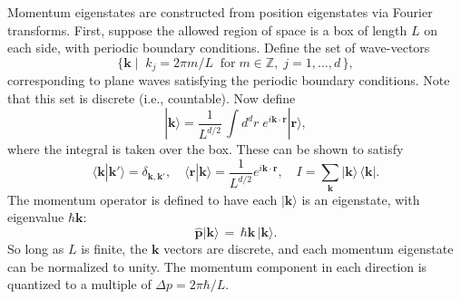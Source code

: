 \documentclass[pra,12pt]{revtex4}
\begin{document}
Momentum eigenstates are constructed from position eigenstates via
Fourier transforms.  First, suppose the allowed region of space is a
box of length $L$ on each side, with periodic boundary conditions.
Define the set of wave-vectors
\begin{equation*}
  \Big\{\mathbf{k}  \; \Big| \;\; k_j = 2\pi m/L\;\;\mathrm{for}
  \;m\in\mathbb{Z}, \; j = 1, \dots,d\, \Big\},
\end{equation*}
corresponding to plane waves satisfying the periodic boundary
conditions.  Note that this set is discrete (i.e., countable).  Now
define
\begin{equation}
  |\mathbf{k}\rangle = \frac{1}{L^{d/2}} \, \int d^dr \; e^{i\mathbf{k}\cdot\mathbf{r}} |\mathbf{r}\rangle,
\end{equation}
where the integral is taken over the box.  These can be shown to
satisfy
\begin{equation}
  \langle\mathbf{k}|\mathbf{k}'\rangle = \delta_{\mathbf{k},\mathbf{k}'}, \quad \langle\mathbf{r}|\mathbf{k}\rangle = \frac{1}{L^{d/2}} e^{i\mathbf{k}\cdot\mathbf{r}}, \quad I = \sum_{\mathbf{k}} |\mathbf{k}\rangle\,\langle\mathbf{k}|.
\end{equation}
The momentum operator is defined to have each $|\mathbf{k}\rangle$ is
an eigenstate, with eigenvalue $\hbar\mathbf{k}$:
\begin{equation}
  \hat{\mathbf{p}} |\mathbf{k}\rangle \,=\, \hbar \mathbf{k}\, |\mathbf{k}\rangle.
\end{equation}
So long as $L$ is finite, the $\mathbf{k}$ vectors are discrete, and
each momentum eigenstate can be normalized to unity.  The momentum
component in each direction is quantized to a multiple of $\Delta p =
2\pi\hbar/L$.
\end{document}
